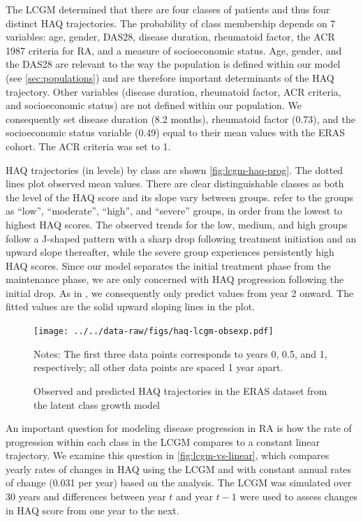\documentclass[11pt,final,fleqn]{article}
\theoremstyle{plain}
\begin{document}
The \citet{norton2014health} LCGM determined that there are four classes of patients and thus four distinct HAQ trajectories. The probability of class membership depends on 7 variables: age, gender, DAS28, disease duration, rheumatoid factor, the ACR 1987 criteria for RA, and a measure of socioeconomic status. Age, gender, and the DAS28 are relevant to the way the population is defined within our model (see \autoref{sec:populations}) and are therefore important determinants of the HAQ trajectory. Other variables (disease duration, rheumatoid factor, ACR criteria, and socioeconomic status) are not defined within our population. We consequently set disease duration (8.2 months), rheumatoid factor (0.73), and the socioeconomic status variable (0.49) equal to their mean values with the ERAS cohort. The ACR criteria was set to 1. 

HAQ trajectories (in levels) by class are shown \autoref{fig:lcgm-haq-prog}. The dotted lines plot observed mean values. There are clear distinguishable classes as both the level of the HAQ score and its slope vary between groups. \citet{norton2014health} refer to the groups as ``low'', ``moderate'', ``high'', and ``severe'' groups, in order from the lowest to highest HAQ scores. The observed trends for the low, medium, and high groups follow a J-shaped pattern with a sharp drop following treatment initiation and an upward slope thereafter, while the severe group experiences persistently high HAQ scores. Since our model separates the initial treatment phase from the maintenance phase, we are only concerned with HAQ progression following the initial drop. As in \citet{stevenson2016adalimumab}, we consequently only predict values from year 2 onward. The fitted values are the solid upward sloping lines in the plot.  
\begin{figure}[H]
\centering
\texttt{[image: ../../data-raw/figs/haq-lcgm-obsexp.pdf]}
\caption{Observed and predicted HAQ trajectories in the ERAS dataset from the latent class growth model}\label{fig:lcgm-haq-prog}
\begin{minipage}{\linewidth}
\footnotesize
Notes: The first three data points corresponds to years 0, 0.5, and 1, respectively; all other data points are spaced 1 year apart.
\end{minipage}
\end{figure}


An important question for modeling disease progression in RA is how the rate of progression within each class in the LCGM compares to a constant linear trajectory. We examine this question in \autoref{fig:lcgm-vs-linear}, which compares yearly rates of changes in HAQ using the LCGM and with constant annual rates of change (0.031 per year) based on the \citet{wolfe2010loss} analysis. The LCGM was simulated over 30 years and differences between year $t$ and year $t-1$ were used to assess changes in HAQ score from one year to the next.  
\end{document}
